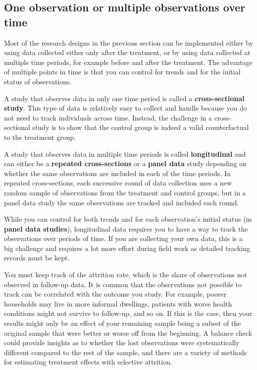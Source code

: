 \subsection{One observation or multiple observations over time}

Most of the research designs in the previous section can be implemented
either by using data collected either only after the treatment,
or by using data collected at multiple time periods,
for example before and after the treatment.
The advantage of multiple points in time is
that you can control for trends and for the initial status of observations.

A study that observes data in only one time period is called
a \textbf{cross-sectional study}.
This type of data is relatively easy to collect and handle because
you do not need to track individuals across time.
Instead, the challenge in a cross-sectional study is to
show that the control group is indeed a valid counterfactual to the treatment group.

A study that observes data in multiple time periods is called \textbf{longitudinal} and
can either be a \textbf{repeated cross-sections} or a \textbf{panel data} study
  
depending on whether the same observations are included in each of the time periods.
In repeated cross-sections,
each successive round of data collection uses a new random sample
of observations from the treatment and control groups,
but in a panel data study the same observations are tracked and included each round.

While you can control for both trends
and for each observation's initial status (in \textbf{panel data studies}),
longitudinal data requires you
to have a way to track the observations over periods of time.
If you are collecting your own data, this is a big challenge
and requires a lot more effort during field work
as detailed tracking records must be kept.

You must keep track of the attrition rate,
which is the share of observations not observed in follow-up data.
It is common that the observations not possible to track
can be correlated with the outcome you study.
For example, poorer households may live in more informal dwellings,
patients with worse health conditions might not survive to follow-up,
and so on.
If this is the case, then your results might only be an effect of your remaining sample
being a subset of the original sample that were better or worse off from the beginning.
A balance check could provide insights
as to whether the lost observations were systematically different
compared to the rest of the sample,
and there are a variety of methods for estimating treatment effects
with selective attrition.

